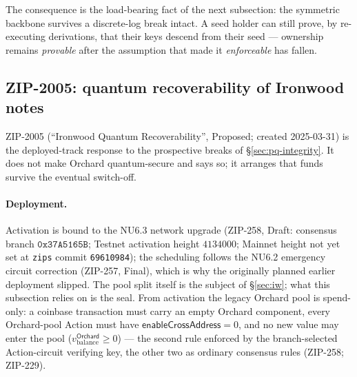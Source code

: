 \documentclass[11pt,a4paper]{article}
\theoremstyle{definition}
\begin{document}
The consequence is the load-bearing fact of the next subsection: the symmetric
backbone survives a discrete-log break intact. A seed holder can still prove,
by re-executing derivations, that their keys descend from their seed ---
ownership remains \emph{provable} after the assumption that made it
\emph{enforceable} has fallen.

\subsection{ZIP-2005: quantum recoverability of Ironwood
notes}\label{sec:pq-zip2005}

ZIP-2005 (``Ironwood Quantum Recoverability'', Proposed; created 2025-03-31)
is the deployed-track response to the prospective breaks of
\S\ref{sec:pq-integrity}. It does not make Orchard quantum-secure and says so;
it arranges that funds survive the eventual switch-off.

\paragraph{Deployment.} Activation is bound to the NU6.3 network upgrade
(ZIP-258, Draft: consensus branch $\mathtt{0x37A5165B}$; Testnet activation
height $4134000$; Mainnet height not yet set at \texttt{zips} commit
\texttt{69610984}); the scheduling follows the NU6.2 emergency circuit
correction (ZIP-257, Final), which is why the originally planned earlier
deployment slipped. The pool split itself is the subject of \S\ref{sec:iw};
what this subsection relies on is the seal. From activation the legacy
Orchard pool is spend-only: a coinbase transaction must carry an empty
Orchard component, every Orchard-pool Action must have
$\mathsf{enableCrossAddress} = 0$, and no new value may enter the pool
($v_{\mathrm{balance}}^{\mathsf{Orchard}} \ge 0$) --- the second rule
enforced by the branch-selected Action-circuit verifying key, the other two
as ordinary consensus rules (ZIP-258; ZIP-229).
\end{document}
